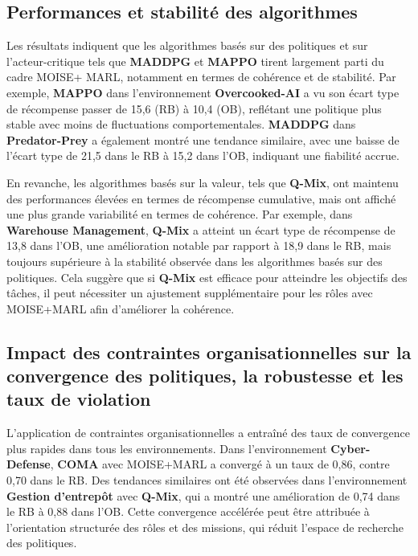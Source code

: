 \subsection{Performances et stabilité des algorithmes}

Les résultats indiquent que les algorithmes basés sur des politiques et sur l'acteur-critique tels que \textbf{MADDPG} et \textbf{MAPPO} tirent largement parti du cadre MOISE+ MARL, notamment en termes de cohérence et de stabilité. Par exemple, \textbf{MAPPO} dans l'environnement \textbf{Overcooked-AI} a vu son écart type de récompense passer de 15,6 (RB) à 10,4 (OB), reflétant une politique plus stable avec moins de fluctuations comportementales. \textbf{MADDPG} dans \textbf{Predator-Prey} a également montré une tendance similaire, avec une baisse de l'écart type de 21,5 dans le RB à 15,2 dans l'OB, indiquant une fiabilité accrue.

En revanche, les algorithmes basés sur la valeur, tels que \textbf{Q-Mix}, ont maintenu des performances élevées en termes de récompense cumulative, mais ont affiché une plus grande variabilité en termes de cohérence. Par exemple, dans \textbf{Warehouse Management}, \textbf{Q-Mix} a atteint un écart type de récompense de 13,8 dans l'OB, une amélioration notable par rapport à 18,9 dans le RB, mais toujours supérieure à la stabilité observée dans les algorithmes basés sur des politiques. Cela suggère que si \textbf{Q-Mix} est efficace pour atteindre les objectifs des tâches, il peut nécessiter un ajustement supplémentaire pour les rôles avec MOISE+MARL afin d'améliorer la cohérence.

\subsection{Impact des contraintes organisationnelles sur la convergence des politiques, la robustesse et les taux de violation}

L'application de contraintes organisationnelles a entraîné des taux de convergence plus rapides dans tous les environnements. Dans l'environnement \textbf{Cyber-Defense}, \textbf{COMA} avec MOISE+MARL a convergé à un taux de 0,86, contre 0,70 dans le RB. Des tendances similaires ont été observées dans l'environnement \textbf{Gestion d'entrepôt} avec \textbf{Q-Mix}, qui a montré une amélioration de 0,74 dans le RB à 0,88 dans l'OB. Cette convergence accélérée peut être attribuée à l'orientation structurée des rôles et des missions, qui réduit l'espace de recherche des politiques.

